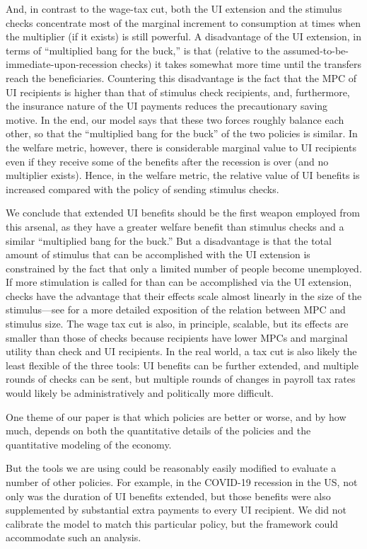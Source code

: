 \documentclass[\econtexRoot/HAFiscal]{subfiles}
\begin{document}
And, in contrast to the wage-tax cut, both the UI extension and the stimulus checks concentrate most of the marginal increment to consumption at times when the multiplier (if it exists) is still powerful.  A disadvantage of the UI extension, in terms of ``multiplied bang for the buck,'' is that (relative to the assumed-to-be-immediate-upon-recession checks) it takes somewhat more time until the transfers reach the beneficiaries. Countering this disadvantage is the fact that the MPC of UI recipients is higher than that of stimulus check recipients, and, furthermore, the insurance nature of the UI payments reduces the precautionary saving motive. In the end, our model says that these two forces roughly balance each other, so that the ``multiplied bang for the buck'' of the two policies is similar. In the welfare metric, however, there is considerable marginal value to UI recipients even if they receive some of the benefits after the recession is over (and no multiplier exists). Hence, in the welfare metric, the relative value of UI benefits is increased compared with the policy of sending stimulus checks.

We conclude that extended UI benefits should be the first weapon employed from this arsenal, as they have a greater welfare benefit than stimulus checks and a similar ``multiplied bang for the buck.'' But a disadvantage is that the total amount of stimulus that can be accomplished with the UI extension is constrained by the fact that only a limited number of people become unemployed.  If more stimulation is called for than can be accomplished via the UI extension, checks have the advantage that their effects scale almost linearly in the size of the stimulus---see \cite{beraja2023size} for a more detailed exposition of the relation between MPC and stimulus size.  The wage tax cut is also, in principle, scalable, but its effects are smaller than those of checks because recipients have lower MPCs and marginal utility than check and UI recipients.  In the real world, a tax cut is also likely the least flexible of the three tools:  UI benefits can be further extended, and multiple rounds of checks can be sent, but multiple rounds of changes in payroll tax rates would likely be administratively and politically more difficult.

One theme of our paper is that which policies are better or worse, and by how much, depends on both the quantitative details of the policies and the quantitative modeling of the economy.  

But the tools we are using could be reasonably easily modified to evaluate a number of other policies.  For example, in the COVID-19 recession in the US, not only was the duration of UI benefits extended, but those benefits were also supplemented by substantial extra payments to every UI recipient.  We did not calibrate the model to match this particular policy, but the framework could accommodate such an analysis.
\end{document}
